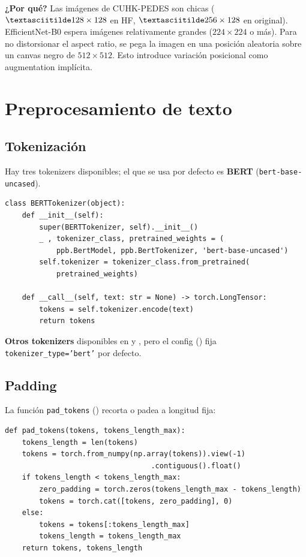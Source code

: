 \noindent\textbf{¿Por qué?} Las imágenes de CUHK-PEDES son
chicas ($\textasciitilde 128 \times 128$ en HF,
$\textasciitilde 256 \times 128$ en original). EfficientNet-B0
espera imágenes relativamente grandes ($224 \times 224$ o
más). Para no distorsionar el aspect ratio, se pega la imagen en
una posición aleatoria sobre un canvas negro de $512 \times 512$.
Esto introduce variación posicional como augmentation implícita.

\section{Preprocesamiento de texto}

\subsection*{Tokenización}

Hay tres tokenizers disponibles; el que se usa por defecto es
\textbf{BERT} (\texttt{bert-base-uncased}).

\begin{verbatim}
class BERTTokenizer(object):
    def __init__(self):
        super(BERTTokenizer, self).__init__()
        _ , tokenizer_class, pretrained_weights = (
            ppb.BertModel, ppb.BertTokenizer, 'bert-base-uncased')
        self.tokenizer = tokenizer_class.from_pretrained(
            pretrained_weights)

    def __call__(self, text: str = None) -> torch.LongTensor:
        tokens = self.tokenizer.encode(text)
        return tokens
\end{verbatim}

\noindent\textbf{Otros tokenizers} disponibles en
 y
, pero el config
() fija \texttt{tokenizer\_type='bert'} por
defecto.

\subsection*{Padding}

La función \texttt{pad\_tokens}
() recorta o
padea a longitud fija:

\begin{verbatim}
def pad_tokens(tokens, tokens_length_max):
    tokens_length = len(tokens)
    tokens = torch.from_numpy(np.array(tokens)).view(-1)
                                  .contiguous().float()
    if tokens_length < tokens_length_max:
        zero_padding = torch.zeros(tokens_length_max - tokens_length)
        tokens = torch.cat([tokens, zero_padding], 0)
    else:
        tokens = tokens[:tokens_length_max]
        tokens_length = tokens_length_max
    return tokens, tokens_length
\end{verbatim}

